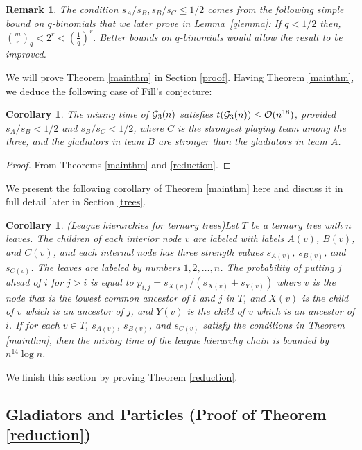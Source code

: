 \documentclass[10 pt]{article}
\newcommand{\G}{{\cal G}}
\newtheorem{remark}[thm]{Remark}
\newtheorem{con}[thm]{Corollary}
\begin{document}
\begin{remark}
The condition $s_A/s_B,s_B/s_C\leq 1/2$ comes from the following simple bound on $q$-binomials that we later prove in Lemma~\ref{qlemma}: 
If  $q<1/2$ then, 
${{m}\choose{r} }_q< 2^r < (\frac{1}{q})^r.$
Better bounds on $q$-binomials would allow the result to be improved.
\end{remark}

We will prove Theorem \ref{mainthm} in Section \ref{proof}.
Having Theorem \ref{mainthm}, we deduce the following case of Fill's conjecture: 
 
 \begin{con}
The mixing time of ${\G}_3(n)$ satisfies $t(\G_{3}(n))\leq {\cal O}(n^{18})$, provided $s_{A}/s_{B}<1/2$ and
$s_{B}/s_{C}<1/2$, where $C$ is the strongest playing team among the three, and  the gladiators in team $B$ are stronger than the gladiators in team $A$.
\end{con} 
 
\begin{proof}
From Theorems \ref{mainthm} and \ref{reduction}. 
\end{proof}
 
We present the following corollary of Theorem \ref{mainthm} here and discuss it in full detail later in Section \ref{trees}.
 
\begin{con}(League hierarchies for ternary trees)\label{LeagueHi}
Let $T$ be a ternary tree  with $n$ leaves. The children of each interior node $v$ are labeled with labels $A(v)$, $B(v)$, and $C(v)$,
and each internal node has three strength values $s_{A(v)}$, $s_{B(v)}$, and $s_{C(v)}$. The leaves are labeled by numbers $1,2,\dots ,n$.
The probability of putting $j$ ahead of $i$ for $j>i$ is equal to $p_{i,j}=s_{X(v)}/(s_{X(v)}+s_{Y(v)})$ where $v$ is the node
that is the lowest common ancestor of $i$ and $j$ in $T$, and $X(v)$ is the child of $v$ which is an ancestor of $j$,
and $Y(v)$ is the child of $v$ which is an ancestor of $i$. If for each $v\in T$, $s_{A(v)}$, $s_{B(v)}$, and $s_{C(v)}$
satisfy the conditions in Theorem \ref{mainthm}, then the mixing time of the league hierarchy chain is bounded by $n^{14}\log n$.
\end{con} 

 
 \medskip
  
We finish this section by proving Theorem \ref{reduction}.
 
\subsection{Gladiators and Particles (Proof of Theorem \ref{reduction})}
\end{document}
